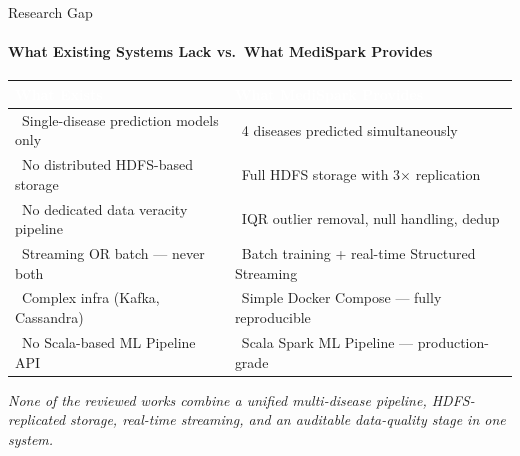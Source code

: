 \documentclass[aspectratio=169, 11pt]{beamer}
\begin{document}
\begin{frame}{Research Gap}
\framesubtitle{What Existing Systems Lack vs.\ What MediSpark Provides}

\vspace{0.2cm}
\begin{center}
\renewcommand{\arraystretch}{1.35}
\begin{tabular}{@{} >{}L{6.5cm} >{}L{6.5cm} @{}}
\toprule
{}
\textcolor{white}{\textbf{What Exists}} & \textcolor{white}{\textbf{What MediSpark Provides}} \\
\midrule
\textcolor{msRed}{} \ Single-disease prediction models only &
\textcolor{msGreen}{} \ 4 diseases predicted simultaneously \\

\textcolor{msRed}{} \ No distributed HDFS-based storage &
\textcolor{msGreen}{} \ Full HDFS storage with 3$\times$ replication \\

\textcolor{msRed}{} \ No dedicated data veracity pipeline &
\textcolor{msGreen}{} \ IQR outlier removal, null handling, dedup \\

\textcolor{msRed}{} \ Streaming OR batch --- never both &
\textcolor{msGreen}{} \ Batch training + real-time Structured Streaming \\

\textcolor{msRed}{} \ Complex infra (Kafka, Cassandra) &
\textcolor{msGreen}{} \ Simple Docker Compose --- fully reproducible \\

\textcolor{msRed}{} \ No Scala-based ML Pipeline API &
\textcolor{msGreen}{} \ Scala Spark ML Pipeline --- production-grade \\
\bottomrule
\end{tabular}
\end{center}

\vspace{0.3cm}
\begin{center}
  \colorbox{msLight}{\parbox{0.9\textwidth}{\centering\small
    \textcolor{msNavy}{\textit{None of the reviewed works combine a unified multi-disease pipeline, HDFS-replicated storage, real-time streaming, and an auditable data-quality stage in one system.}}
  }}
\end{center}

\end{frame}
\end{document}
